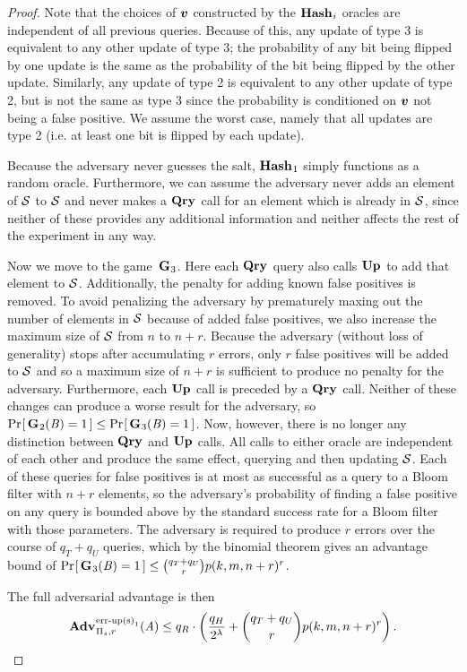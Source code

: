 \begin{proof}
Note that the choices of $\vv$ constructed by the $\mathbf{Hash}\hspace{0.5pt}_i$ oracles are independent of all previous queries. Because of this, any update of type 3 is equivalent to any other update of type 3; the probability of any bit being flipped by one update is the same as the probability of the bit being flipped by the other update. Similarly, any update of type 2 is equivalent to any other update of type 2, but is not the same as type 3 since the probability is conditioned on $\vv$ not being a false positive. We assume the worst case, namely that all updates are type 2 (i.e. at least one bit is flipped by each update).

Because the adversary never guesses the salt, $\mathbf{Hash}\hspace{0.5pt}_1$ simply functions as a random oracle. Furthermore, we can assume the adversary never adds an element of $\mathcal{S}$ to $\mathcal{S}$ and never makes a $\mathbf{Qry}\hspace{0.5pt}$ call for an element which is already in $\mathcal{S}$, since neither of these provides any additional information and neither affects the rest of the experiment in any way.

Now we move to the game~$\mathbf{G}\hspace{0.5pt}_3$. Here each $\mathbf{Qry}\hspace{0.5pt}$ query also calls $\mathbf{Up}\hspace{0.5pt}$ to add that element to $\mathcal{S}$. Additionally, the penalty for adding known false positives is removed. To avoid penalizing the adversary by prematurely maxing out the number of elements in $\mathcal{S}$ because of added false positives, we also increase the maximum size of $\mathcal{S}$ from $n$ to $n+r$. Because the adversary (without loss of generality) stops after accumulating $r$ errors, only $r$ false positives will be added to $\mathcal{S}$ and so a maximum size of $n+r$ is sufficient to produce no penalty for the adversary. Furthermore, each $\mathbf{Up}\hspace{0.5pt}$ call is preceded by a $\mathbf{Qry}\hspace{0.5pt}$ call. Neither of these changes can produce a worse result for the adversary, so $\Pr\hspace{-1pt}\left[\,\mathbf{G}\hspace{0.5pt}_2(\mathit{B}) = 1\,\right] \le \Pr\hspace{-1pt}\left[\,\mathbf{G}\hspace{0.5pt}_3(\mathit{B}) = 1\,\right]$. Now, however, there is no longer any distinction between $\mathbf{Qry}\hspace{0.5pt}$ and $\mathbf{Up}\hspace{0.5pt}$ calls. All calls to either oracle are independent of each other and produce the same effect, querying and then updating $\mathcal{S}$. Each of these queries for false positives is at most as successful as a query to a Bloom filter with $n+r$ elements, so the adversary's probability of finding a false positive on any query is bounded above by the standard success rate for a Bloom filter with those parameters. The adversary is required to produce $r$ errors over the course of $q_T+q_U$ queries, which by the binomial theorem gives an advantage bound of $\Pr\hspace{-1pt}\left[\,\mathbf{G}\hspace{0.5pt}_3(\mathit{B}) = 1\,\right] \le \binom{q_T+q_U}{r}p(k, m, n+r)^r$.

The full adversarial advantage is then
$$\Adv{\erreps_1}_{\struct_s,r}(\advA) \le q_R \cdot \left(\frac{q_H}{2^\lambda} + \binom{q_T+q_U}{r}p(k, m, n+r)^r\right).$$
\missingqed
\end{proof}

